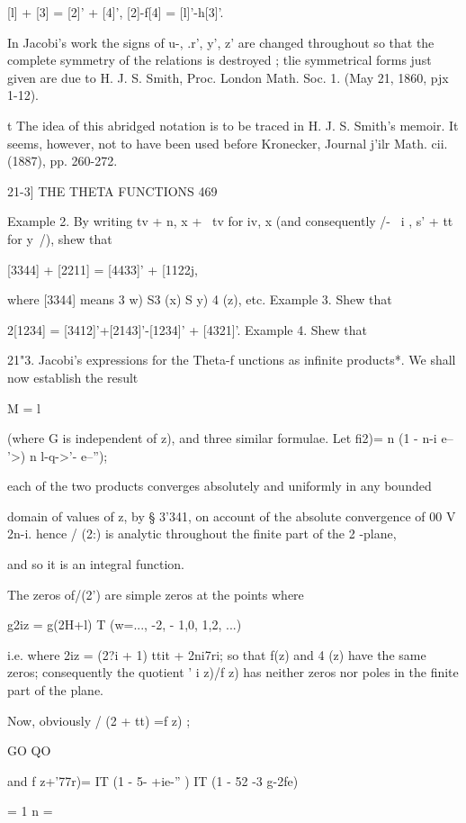 [l] + [3] = [2]' + [4]', [2]-f[4] = [l]'-h[3]'. 

In Jacobi's work the signs of u-, .r', y', z' are changed throughout so that the complete 
symmetry of the relations is destroyed ; tlie symmetrical forms just given are due to H. J. S. Smith, 
Proc. London Math. Soc. 1. (May 21, 1860, pjx 1-12). 

t The idea of this abridged notation is to be traced in H. J. S. Smith's memoir. It seems, 
however, not to have been used before Kronecker, Journal j'ilr Math. cii. (1887), pp. 260-272. 



21-3] THE THETA FUNCTIONS 469 

Example 2. By writing tv +  n, x + \ tv for iv, x (and consequently  /- \ i , s' +  tt 
for y\ /), shew that 

[3344] + [2211] = [4433]' + [1122j, 

where [3344] means  3  w) S3 (x) S   y)  4 (z), etc. 
Example 3. Shew that 

2[1234] = [3412]'+[2143]'-[1234]' + [4321]'. 
Example 4. Shew that 

21"3. Jacobi's expressions for the Theta-f unctions as infinite products*. 
We shall now establish the result 

M = l 

(where G is independent of z), and three similar formulae. 
Let fi2)= n (1 -  n-i e-- '>) n  l-q->'- e--''); 

each of the two products converges absolutely and uniformly in any bounded 

domain of values of z, by § 3'341, on account of the absolute convergence of 
00 
V  2n-i. hence / (2:) is analytic throughout the finite part of the 2 -plane, 

and so it is an integral function. 

The zeros of/(2') are simple zeros at the points where 

g2iz = g(2H+l) T  (w=..., -2, - 1,0, 1,2, ...) 

i.e. where 2iz = (2?i + 1) ttit + 2ni7ri; so that f(z) and  4 (z) have the same 
zeros; consequently the quotient ' i z)/f z) has neither zeros nor poles in 
the finite part of the plane. 

Now, obviously / (2  + tt) =f z) ; 

GO QO 

and f z+'77r)= IT (1 - 5- +ie-'' ) IT (1 - 52 -3 g-2fe) 

  = 1 n = \ 

